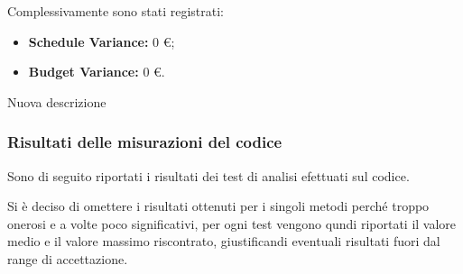 \noindent Complessivamente sono stati registrati:
\begin{itemize}
	\item \textbf{Schedule Variance:} 0 \euro;
	\item \textbf{Budget Variance:} 0 \euro.
\end{itemize}

\noindent Nuova descrizione

\subsubsection{Risultati delle misurazioni del codice}
\label{appendice 7}
\vspace{3mm}

Sono di seguito riportati i risultati dei test di analisi efettuati sul codice.

Si è deciso di omettere i risultati ottenuti per i singoli metodi perché troppo onerosi e a volte poco significativi, per ogni test vengono qundi riportati il valore medio e il valore massimo riscontrato, giustificandi eventuali risultati fuori dal range di accettazione.


